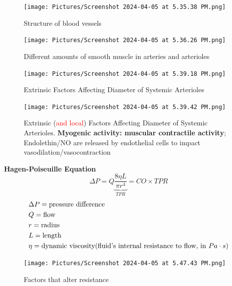 \documentclass[11pt,fleqn]{book} %
\begin{document}
\begin{figure}[h!]
\begin{center}
    \texttt{[image: Pictures/Screenshot 2024-04-05 at 5.35.38 PM.png]}
\end{center}
    \caption{Structure of blood vessels}
\end{figure}

\begin{figure}[h!]
\begin{center}
    \texttt{[image: Pictures/Screenshot 2024-04-05 at 5.36.26 PM.png]}
\end{center}
    \caption{Different amounts of smooth muscle in arteries and arterioles}
\end{figure}

\begin{figure}[h!]
\begin{center}
    \texttt{[image: Pictures/Screenshot 2024-04-05 at 5.39.18 PM.png]}
\end{center}
    \caption{Extrinsic Factors Affecting
Diameter of Systemic Arterioles}
\end{figure}

\begin{figure}[h!]
\begin{center}
    \texttt{[image: Pictures/Screenshot 2024-04-05 at 5.39.42 PM.png]}
\end{center}
    \caption{Extrinsic (\textcolor{red}{and local}) Factors Affecting
Diameter of Systemic Arterioles. \textbf{Myogenic activity: muscular contractile activity}; Endolethin/NO are released by endothelial cells to impact vasodilation/vasocontraction}
\end{figure}
\newpage
\begin{theorem}
    \textbf{Hagen-Poiseuille Equation}
    $$\Delta P=Q\underbrace{\frac{8\eta L}{\pi r^4}}_{TPR}=CO\times TPR$$
    \begin{align*}
        &\Delta P=\text{pressure difference}\\
        &Q=\text{flow}\\
        &r={\rm radius}\\
        &L={\rm length}\\
        &\eta=\text{dynamic viscosity(fluid's internal resistance to flow, in }Pa\cdot s)
    \end{align*}
\end{theorem}

\begin{figure}[h!]
\begin{center}
    \texttt{[image: Pictures/Screenshot 2024-04-05 at 5.47.43 PM.png]}
\end{center}
    \caption{Factors that alter resistance}
\end{figure}
\end{document}
